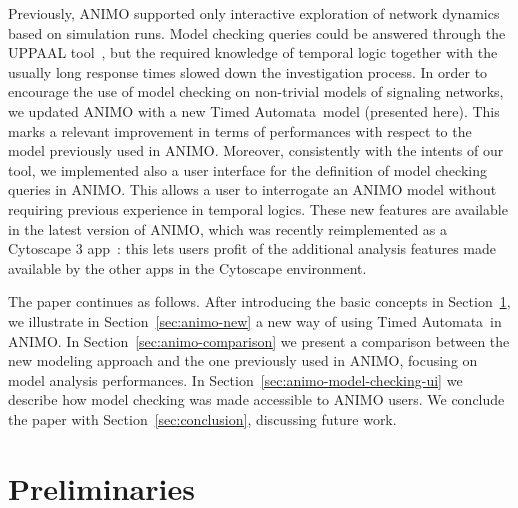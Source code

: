 \documentclass{llncs}
\newcommand{\tas}{Timed Automata}
\begin{document}
Previously, ANIMO supported only interactive exploration of network dynamics based on simulation runs. 
Model checking queries could be answered through the UPPAAL tool~\cite{uppaal}, but
the required knowledge of temporal logic together with the usually long response times slowed down the investigation process.
In order to encourage the use of model checking on non-trivial models of
signaling networks, we updated ANIMO with a new \tas\ model (presented here). This marks a relevant improvement in terms of
performances with respect to the model previously used in ANIMO. Moreover, consistently with the intents of our tool, we
implemented also a user interface for the definition of model checking queries in ANIMO. This allows a
user to interrogate an ANIMO model without requiring previous experience in temporal logics. These new
features are available in the latest version of ANIMO, which was recently reimplemented as a Cytoscape 3 app~\cite{animo-app-site}:
this lets users profit of the additional analysis features made available by the other apps in the Cytoscape environment.

The paper continues as follows.
After introducing the basic concepts in Section~\ref{sec:basics}, we illustrate in
Section~\ref{sec:animo-new} a new way of using \tas\ in ANIMO.
In Section~\ref{sec:animo-comparison} we present a comparison between the new modeling approach and the
one previously used in ANIMO,
focusing on model analysis performances. In Section~\ref{sec:animo-model-checking-ui} we describe
how model checking was made accessible to ANIMO users.
We conclude the paper with Section~\ref{sec:conclusion}, discussing future work.

\section{Preliminaries}\label{sec:basics}
\end{document}

